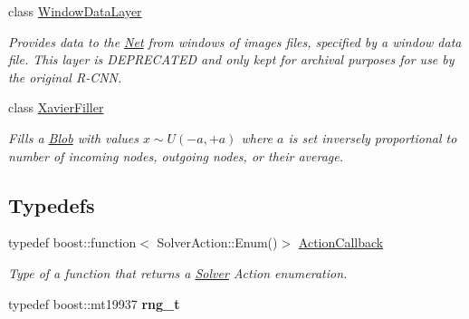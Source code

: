 \begin{DoxyCompactItemize}
class \hyperlink{classcaffe_1_1WindowDataLayer}{Window\+Data\+Layer}
\begin{DoxyCompactList}\small\item\em Provides data to the \hyperlink{classcaffe_1_1Net}{Net} from windows of images files, specified by a window data file. This layer is {\itshape D\+E\+P\+R\+E\+C\+A\+T\+ED} and only kept for archival purposes for use by the original R-\/\+C\+NN. \end{DoxyCompactList}\item 
class \hyperlink{classcaffe_1_1XavierFiller}{Xavier\+Filler}
\begin{DoxyCompactList}\small\item\em Fills a \hyperlink{classcaffe_1_1Blob}{Blob} with values $ x \sim U(-a, +a) $ where $ a $ is set inversely proportional to number of incoming nodes, outgoing nodes, or their average. \end{DoxyCompactList}\end{DoxyCompactItemize}
\subsection*{Typedefs}
\begin{DoxyCompactItemize}
\item 
typedef boost\+::function$<$ Solver\+Action\+::\+Enum()$>$ \hyperlink{namespacecaffe_a79ce9ffbdd44b367252e0b8cf99bf430}{Action\+Callback}\hypertarget{namespacecaffe_a79ce9ffbdd44b367252e0b8cf99bf430}{}\label{namespacecaffe_a79ce9ffbdd44b367252e0b8cf99bf430}

\begin{DoxyCompactList}\small\item\em Type of a function that returns a \hyperlink{classcaffe_1_1Solver}{Solver} Action enumeration. \end{DoxyCompactList}\item 
typedef boost\+::mt19937 {\bfseries rng\+\_\+t}\hypertarget{namespacecaffe_aeff0d41eefd30caf64b0c9d03e142af3}{}\label{namespacecaffe_aeff0d41eefd30caf64b0c9d03e142af3}

\end{DoxyCompactItemize}
